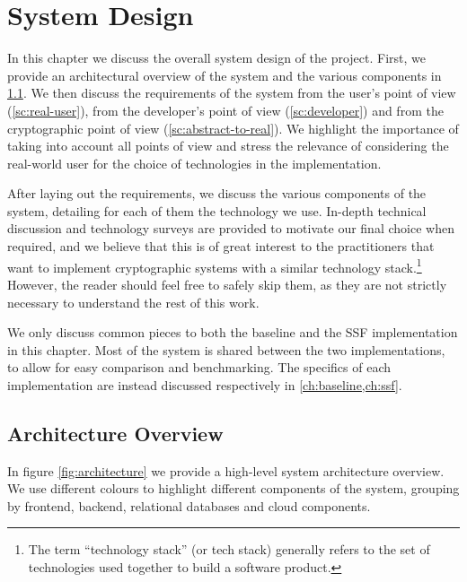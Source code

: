 \chapter{System Design}\label{ch:setup}

In this chapter we discuss the overall system design of the project.
First, we provide an architectural overview
of the system and the various components in \cref{sc:architectural-overview}.
We then discuss the requirements of the system from the user's point of view
(\cref{sc:real-user}), from the developer's point of view
(\cref{sc:developer}) and from the cryptographic point of view
(\cref{sc:abstract-to-real}). We highlight the importance
of taking into account all points of view and stress the 
relevance of considering the real-world
user for the choice of technologies in the implementation. 

After laying out the requirements, we discuss the various
components of the system, detailing for each of them
the technology we use. In-depth technical
discussion and technology surveys are provided
to motivate our final choice when required, and we believe
that this is of great interest to the practitioners
that want to implement cryptographic systems with 
a similar technology stack.\footnote{The term ``technology stack'' (or tech stack) generally refers to the set of technologies used together to build a software product.}
However, the reader should feel free to safely skip
them, as they are not strictly necessary to understand 
the rest of this work.

We only discuss common
pieces to both the baseline and the SSF implementation
in this chapter. Most of the system is
shared between the two implementations, to allow
for easy comparison and benchmarking.
The specifics of each implementation are instead discussed respectively in \cref{ch:baseline,ch:ssf}.

\section{Architecture Overview}\label{sc:architectural-overview}

In figure \cref{fig:architecture} we provide a high-level system architecture overview.
We use different colours to highlight different components of the system, grouping
by frontend, backend, relational databases and cloud components.

